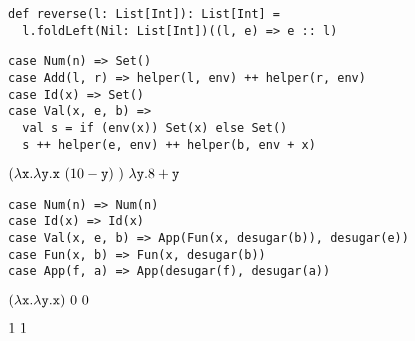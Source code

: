 \textbf{}
\vspace{-1em}
\begin{verbatim}
def reverse(l: List[Int]): List[Int] =
  l.foldLeft(Nil: List[Int])((l, e) => e :: l)
\end{verbatim}

\textbf{}
\vspace{-1em}
\begin{verbatim}
case Num(n) => Set()
case Add(l, r) => helper(l, env) ++ helper(r, env)
case Id(x) => Set()
case Val(x, e, b) =>
  val s = if (env(x)) Set(x) else Set()
  s ++ helper(e, env) ++ helper(b, env + x)
\end{verbatim}

\textbf{}

$(\lambda\texttt{x}.\lambda\texttt{y}.\texttt{x}\ (10-\texttt{y})\ )\ \lambda\texttt{y}.8+\texttt{y}$
\\

\textbf{}
\vspace{-1em}
\begin{verbatim}
case Num(n) => Num(n)
case Id(x) => Id(x)
case Val(x, e, b) => App(Fun(x, desugar(b)), desugar(e))
case Fun(x, b) => Fun(x, desugar(b))
case App(f, a) => App(desugar(f), desugar(a))
\end{verbatim}

\textbf{}

$(\lambda\texttt{x}.\lambda\texttt{y}.\texttt{x})\ 0\ 0$
\\

\textbf{}

$1\ 1$
\\


